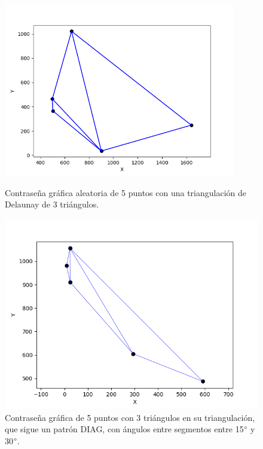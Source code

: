 \documentclass[12pt]{report}
\begin{document}
	\begin{figure}[h]
	\centering
	\begin{minipage}{0.45\textwidth}
		\centering
	\includegraphics[width=0.9\textwidth]{alea3td.png}
	\caption{Contraseña gráfica aleatoria de 5 puntos con una triangulación de Delaunay de 3 triángulos.}
	\label{3TD}
		
	\end{minipage}\hfill
	\begin{minipage}{0.45\textwidth}
		\centering
		\includegraphics[width=0.9\linewidth]{3td30.png}  %
		\caption{Contraseña gráfica de 5 puntos con 3 triángulos en su triangulación, que sigue un patrón DIAG, con ángulos entre segmentos entre 15$\degree$ y 30$\degree$.}
		\label{3td30}
	\end{minipage}
\end{figure}
\end{document}
